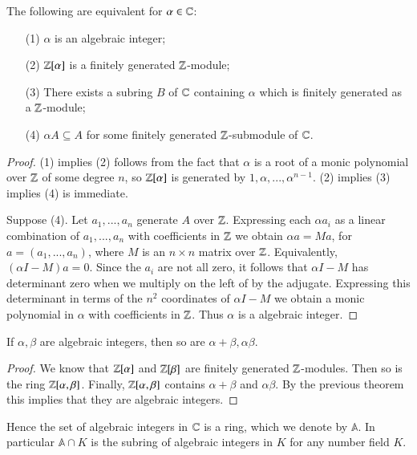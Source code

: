 \begin{thm}
    The following are equivalent for $\alpha \in \mathbb C$: \begin{enumerate}
        \item[(1)] $\alpha$ is an algebraic integer;
        \item[(2)] $\mathbb Z[\alpha]$ is a finitely generated $\mathbb Z$-module;
        \item[(3)] There exists a subring $B$ of $\mathbb C$ containing $\alpha$ which is finitely generated as a $\mathbb Z$-module;
        \item[(4)] $\alpha A \subseteq A$ for some finitely generated $\mathbb Z$-submodule of $\mathbb C$.
    \end{enumerate}
\end{thm}
\begin{proof}
    (1) implies (2) follows from the fact that $\alpha$ is a root of a monic polynomial over $\mathbb Z$ of some degree $n$, so $\mathbb Z[\alpha]$ is generated by $1,\alpha,...,\alpha^{n-1}$. (2) implies (3) implies (4) is immediate.

    Suppose (4). Let $a_1,...,a_n$ generate $A$ over $\mathbb Z$. Expressing each $\alpha a_i$ as a linear combination of $a_1,...,a_n$ with coefficients in $\mathbb Z$ we obtain $\alpha a = Ma$, for $a = (a_1,...,a_n)$, where $M$ is an $n\times n $ matrix over $\mathbb Z$. Equivalently, $(\alpha I-M)a = 0$. Since the $a_i$ are not all zero, it follows that $\alpha I-M$ has determinant zero when we multiply on the left of by the adjugate. Expressing this determinant in terms of the $n^2$ coordinates of $\alpha I-M$ we obtain a monic polynomial in $\alpha$ with coefficients in $\mathbb Z$. Thus $\alpha$ is a algebraic integer.
\end{proof}

\begin{cor}
    If $\alpha,\beta$ are algebraic integers, then so are $\alpha+\beta,\alpha\beta$.
\end{cor}
\begin{proof}
    We know that $\mathbb Z[\alpha]$ and $\mathbb Z[\beta]$ are finitely generated $\mathbb Z$-modules. Then so is the ring $\mathbb Z[\alpha,\beta]$. Finally, $\mathbb Z[\alpha,\beta]$ contains $\alpha+\beta$ and $\alpha\beta$. By the previous theorem this implies that they are algebraic integers.
\end{proof}

Hence the set of algebraic integers in $\mathbb C$ is a ring, which we denote by $\mathbb{A}$. In particular $\mathbb{A}\cap K$ is the subring of algebraic integers in $K$ for any number field $K$.


